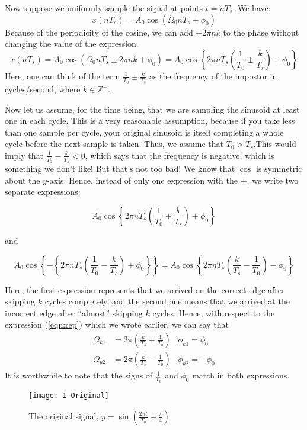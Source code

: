 Now suppose we uniformly sample the signal at points $t=nT_s$. We have:
\[x(nT_s)=A_0\cos(\Omega_0 n T_s +\phi_0)\]
Because of the periodicity of the cosine, we can add $\pm 2\pi n k$ to the phase without changing the value of the expression.
\[x(nT_s)=A_0\cos(\Omega_0 n T_s \pm 2\pi nk +\phi_0)
=A_0\cos\left\{2\pi n T_s \left(\frac{1}{T_0} \pm \frac{k}{T_s}\right) +\phi_0\right\}\]
Here, one can think of the term $\frac{1}{T_0}\pm\frac{k}{T_s}$ as the frequency of the impostor in cycles/second, where $k\in \mathbb{Z}^+$.

Now let us assume, for the time being, that we are sampling the sinusoid at least one in each cycle. This is a very reasonable assumption, because if you take less than one sample per cycle, your original sinusoid is itself completing a whole cycle before the next sample is taken. Thus, we assume that $T_0 > T_s$.This would imply that $\frac{1}{T_0}-\frac{k}{T_s}<0$, which says that the frequency is negative, which is something we don't like! But that's not too bad! We know that $\cos$ is symmetric about the $y$-axis. Hence, instead of only one expression with the $\pm$, we write two separate expressions:

\[A_0\cos\left\{2\pi n T_s \left(\frac{1}{T_0} + \frac{k}{T_s}\right) +\phi_0\right\}\]

\centerline{and}

\[A_0\cos\left\{-\left\{2\pi n T_s \left(\frac{1}{T_0} - \frac{k}{T_s}\right) +\phi_0\right\}\right\}=
A_0\cos\left\{2\pi n T_s \left(\frac{k}{T_s}-\frac{1}{T_0}\right) - \phi_0\right\}
\]

Here, the first expression represents that we arrived on the correct edge after skipping $k$ cycles completely, and the second one means that we arrived at the incorrect edge after ``almost'' skipping $k$ cycles. Hence, with respect to the expression (\ref{eqn:rep}) which we wrote earlier, we can say that
\begin{align}
\Omega_{k1}&=2\pi\left(\frac{k}{T_s} + \frac{1}{T_0}\right)  &\phi_{k1}=\phi_0\\
\Omega_{k2}&=2\pi\left(\frac{k}{T_s} - \frac{1}{T_0}\right) &\phi_{k2}=-\phi_0
\end{align}
It is worthwhile to note that the signs of $\frac{1}{T_0}$ and $\phi_0$ match in both expressions.

\begin{figure}[ht]
\texttt{[image: 1-Original]}
\caption{\label{fig:1}The original signal, $y=\sin\left(\frac{2\pi t}{T_0}+\frac{\pi}{4}\right)$}
\end{figure}

